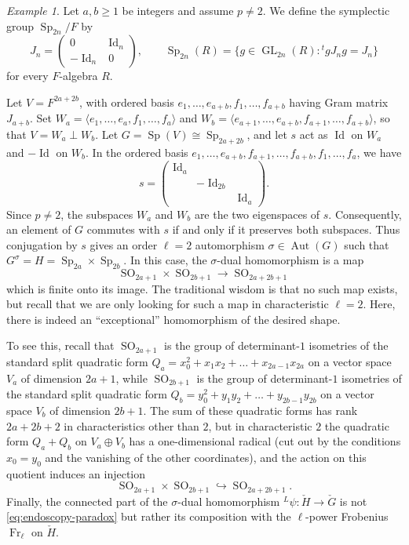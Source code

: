 \documentclass[reqno]{amsart}
\numberwithin{equation}{subsection}
\newcommand{\co}{\colon}
\newcommand{\ld}{{}^L}
\newcommand{\inj}{\hookrightarrow}
\DeclareMathOperator{\GL}{GL}
\DeclareMathOperator{\Sp}{Sp}
\DeclareMathOperator{\SO}{SO}
\DeclareMathOperator{\Aut}{Aut}
\DeclareMathOperator{\Id}{Id}
\DeclareMathOperator{\Fr}{Fr}
\newcommand{\chG}{\check{G}}
\newcommand{\chH}{\check{H}}
\theoremstyle{remark}
\newtheorem{example}[thm]{Example}
\numberwithin{equation}{subsection}
\numberwithin{figure}{subsection}
\begin{document}
\begin{example}\label{ex:spectral-endoscopy}
Let $a,b \geq 1$ be integers and assume $p \neq 2$. We define the symplectic group $\Sp_{2n}/F$ by
\[
J_n=\begin{pmatrix}0&\Id_n\\-\Id_n&0\end{pmatrix},\qquad
\Sp_{2n}(R)=\{g\in\GL_{2n}(R):{}^t gJ_ng=J_n\}
\]
for every $F$-algebra $R$. 

Let $V=F^{2a+2b}$, with ordered basis
$e_1,\ldots,e_{a+b},f_1,\ldots,f_{a+b}$ having Gram matrix $J_{a+b}$. Set
$W_a=\langle e_1,\ldots,e_a,f_1,\ldots,f_a\rangle$ and
$W_b=\langle e_{a+1},\ldots,e_{a+b},f_{a+1},\ldots,f_{a+b}\rangle$,
so that $V=W_a \perp W_b$. Let $G=\Sp(V)\cong \Sp_{2a+2b}$, and let $s$ act as $\Id$ on $W_a$ and $-\Id$ on $W_b$. In the ordered basis
$e_1,\ldots,e_{a+b},f_{a+1},\ldots,f_{a+b},f_1,\ldots,f_a$, we have
\[
s = \begin{pmatrix} \Id_a \\ & - \Id_{2b} & \\ & &\Id_a \end{pmatrix}.
\]
Since $p\neq 2$, the subspaces $W_a$ and $W_b$ are the two eigenspaces of $s$. Consequently, an element of $G$ commutes with $s$ if and only if it preserves both subspaces. 
Thus conjugation by $s$ gives an order $\ell=2$ automorphism $\sigma \in \Aut(G)$ such that
$G^\sigma=H=\Sp_{2a}\times\Sp_{2b}$. In this case, the $\sigma$-dual homomorphism is a map
\[
\SO_{2a+1} \times \SO_{2b+1} \rightarrow \SO_{2a+2b+1}
\]
which is finite onto its image. The traditional wisdom is that no such map exists, but recall that we are only looking for such a map in characteristic $\ell=2$. Here, there is indeed an ``exceptional'' homomorphism of the desired shape.

To see this, recall that $\SO_{2a+1}$ is the group of determinant-$1$ isometries of the standard split quadratic form $Q_a = x_0^2 + x_1x_2 + \ldots + x_{2a-1}x_{2a}$ on a vector space $V_a$ of dimension $2a+1$, while $\SO_{2b+1}$ is the group of determinant-$1$ isometries of the standard split quadratic form $Q_b = y_0^2 + y_1y_2 + \ldots + y_{2b-1}y_{2b}$ on a vector space $V_b$ of dimension $2b+1$. The sum of these quadratic forms has rank $2a+2b+2$ in characteristics other than $2$, but in characteristic $2$ the quadratic form $Q_a + Q_b$ on $V_a \oplus V_b$ has a one-dimensional radical (cut out by the conditions $x_0 = y_0$ and the vanishing of the other coordinates), and the action on this quotient induces an injection
\begin{equation}\label{eq:endoscopy-paradox}
\SO_{2a+1} \times \SO_{2b+1} \inj \SO_{2a+2b+1}.
\end{equation}
Finally, the connected part of the $\sigma$-dual homomorphism $\ld \psi \co \chH \rightarrow \chG$ is not \eqref{eq:endoscopy-paradox} but rather its composition with the $\ell$-power Frobenius $\Fr_\ell$ on $\chH$.
\end{example}
\end{document}
